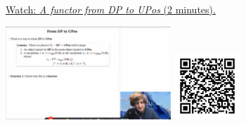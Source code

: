 
\begin{minipage}{10cm}
    \href{https://act4e-spring21.netlify.app/videos/spring2021-enrichment:from-dp-to-upos.html}{Watch: \emph{A functor from DP to UPos} (2 minutes).}
        
    \href{https://act4e-spring21.netlify.app/videos/spring2021-enrichment:from-dp-to-upos.html}{\includegraphics[height=3.5cm]{spring2021-enrichment:from-dp-to-upos/thumbnails.jpg}}
    \href{https://act4e-spring21.netlify.app/videos/spring2021-enrichment:from-dp-to-upos.html}{\includegraphics[height=2.5cm]{spring2021-enrichment:from-dp-to-upos/qrcode.png}}
\end{minipage}
